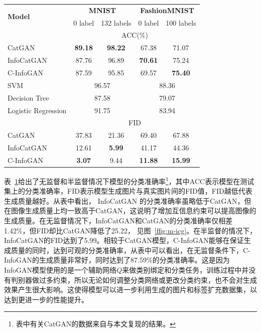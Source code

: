 \begin{table}[hbtp]
  \renewcommand\arraystretch{0.8} %
  \centering
  \label{tab:acc}
  \begin{tabular}{lcccc}
    \toprule
    \multirow{2}{*}{\bf Model} & \multicolumn{2}{c}{\bf MNIST} & \multicolumn{2}{c}{\bf FashionMNIST}\\
    \cline{2-5}
                           & 0 label & 132 labels & 0 label & 100 labels \\
    \midrule
    ~ & \multicolumn{4}{c}{ACC(\%)} \\ \hline
    CatGAN & \textbf{89.18} & \textbf{98.22} & 67.38 & 71.07  \\
    InfoCatGAN & 87.76 & 96.89 & \textbf{70.61} & 75.24  \\
    C-InfoGAN & 87.59 & 95.85 & 69.57 & \textbf{75.40}   \\ \hline
    SVM & \multicolumn{2}{c}{96.57} & \multicolumn{2}{c}{88.36} \\
    Decision Tree & \multicolumn{2}{c}{87.58} & \multicolumn{2}{c}{79.07} \\
    Logistic Regression & \multicolumn{2}{c}{91.75} & \multicolumn{2}{c}{83.94} \\
    \hline\hline
    ~ & \multicolumn{4}{c}{FID} \\ \hline
    CatGAN & 37.83 & 21.36 & 69.40 & 67.88  \\
    InfoCatGAN & 12.61 & \textbf{5.99} & 41.17 & 44.36  \\
    C-InfoGAN & \textbf{3.07} & 9.44 & \textbf{11.88} & \textbf{15.99}   \\
    \bottomrule
  \end{tabular}
\end{table}

表~\ref{tab:acc}给出了无监督和半监督情况下模型的分类准确率\footnote{表中有关CatGAN的数据来自与本文复现的结果。}，其中ACC表示模型在测试集上的分类准确率，FID表示模型生成图片与真实图片间的FID值，FID越低代表生成质量越好。从表中看出，
InfoCatGAN 的分类准确率虽略低于CatGAN，但在图像生成质量上均一致高于CatGAN，这说明了增加互信息约束可以提高图像的生成质量。在无监督情况下，InfoCatGAN和CatGAN的分类准确率仅相差1.42\%，但FID却比CatGAN降低了25.22，
见图~\ref{ffig:m-icg}。在半监督的情况下，InfoCatGAN的FID达到了5.99。相较于CatGAN模型，C-InfoGAN能够在保证生成质量的同时，达到可观的分类准确率，从表中可以看出，在无监督条件下，C-InfoGAN的生成质量非常好，同时达到了87.59\%的分类准确率。这是因为InfoGAN模型使用的是一个辅助网络$Q$来做类别绑定和分类任务，训练过程中并没有判别器做过多约束，所以无论如何调整分类网络或更改分类约束，也不会对生成效果产生很大影响。这使得模型可以进一步利用生成的图片和标签扩充数据集，以达到更进一步的性能提升。

